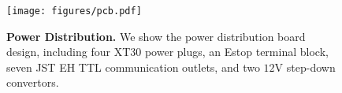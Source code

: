 \begin{figure}
  \centering
  \texttt{[image: figures/pcb.pdf]}
  \caption{\textbf{Power Distribution.} We show the power distribution board design, including four XT30 power plugs, an Estop terminal block, seven JST EH TTL communication outlets, and two $12\mathrm{V}$ step-down convertors.}
  \label{fig:pcb}
  \vspace{-3mm}
\end{figure}



